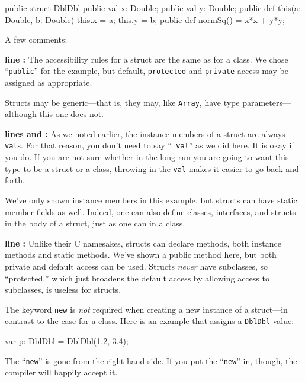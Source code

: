 \begin{xtennum}[]
public  struct DblDbl {
   public val x: Double;
   public val y: Double;
   public def this(a: Double, b: Double) { 
      this.x = a; this.y = b;
   }
   public def normSq() = x*x + y*y;
}
\end{xtennum}



A few comments:
\begin{description}
\item{\bf line :} The accessibility rules for a struct are the same as for a
class.  We chose ``{\tt public}'' for the example, but default, {\tt protected} 
and {\tt private} access may be assigned as appropriate.

Structs may be generic---that is, they may, like {\tt Array}, have type
parameters---although this one does not.

\item{\bf lines  and :}  As we noted earlier, the instance members of a struct
are always {\tt val}s. For that reason, you don't need to say ``{\tt
val}'' as we did here.  It is okay if you do. If you are not sure whether in
the long run you are going to want this type to be a struct or a class,
throwing in the {\tt val} makes it easier to go back and forth.

We've only shown instance members in this example, but
structs can have static member fields as well.
Indeed, one can also define classes, interfaces, and structs in the
body of a struct, just as one can in a class.
\item 
 
\item{\bf line :} Unlike their C namesakes, \Xten{} structs can declare
methods, both instance methods and static methods. We've shown a public
method here, but both private and default access can be used. Structs
{\em never} have subclasses, so ``protected,'' which just broadens the default
access by allowing access to subclasses, is useless for structs.
\end{description}

The keyword {\tt new} is {\em not} required when creating
 a new instance of a struct---in contrast to the case for a class.
Here is an example that assigns a {\tt DblDbl} value:
\begin{xtennum}[]
     var p: DblDbl = DblDbl(1.2, 3.4);
\end{xtennum}
The ``{\tt new}'' is gone from the right-hand side.
If you put the ``{\tt new}'' in, though, the compiler will happily accept it.

